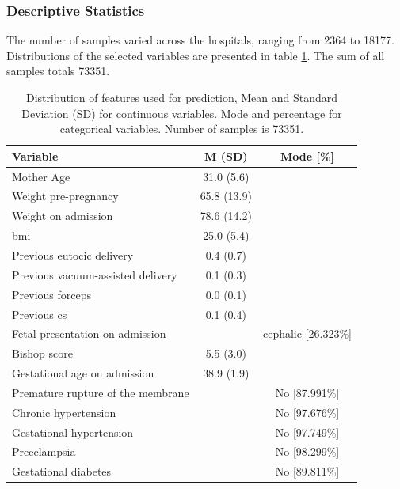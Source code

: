 
\subsubsection{Descriptive Statistics}
The number of samples varied across the hospitals, ranging from 2364 to 18177. Distributions of the selected variables are presented in table \ref{tab:obs_material_1}. The sum of all samples totals 73351.

\begin{table}[htbp]
  \centering
  \caption[Distribution of features used for prediction of delivery Type]{Distribution of features used for prediction, Mean and Standard Deviation (SD) for continuous variables. Mode and percentage for categorical variables. Number of samples is 73351.}
  \label{tab:obs_material_1}
   \renewcommand{\arraystretch}{1.02} %
  \setlength{\tabcolsep}{12pt} %
    \begin{tabular}{m{15em}cc}
    \toprule
        Variable & M (SD) & Mode [\%] \\ 
        \hline
        Mother Age & 31.0 (5.6) & ~ \\ 
        Weight pre-pregnancy & 65.8 (13.9) & ~ \\ 
        Weight on admission & 78.6 (14.2) & ~ \\ 
        \ac{bmi} & 25.0 (5.4) & ~ \\ 
        Previous eutocic delivery & 0.4 (0.7) & ~ \\ 
        Previous vacuum-assisted delivery & 0.1 (0.3) & ~ \\ 
        Previous forceps & 0.0 (0.1) & ~ \\ 
        Previous \ac{cs} & 0.1 (0.4) & ~ \\ 
        Fetal presentation on admission & ~ & cephalic [26.323\%] \\ 
        Bishop score & 5.5 (3.0) & ~ \\ 
        Gestational age on admission & 38.9 (1.9) & ~ \\ 
        Premature rupture of the membrane & ~ & No [87.991\%] \\ 
        Chronic hypertension & ~ & No [97.676\%] \\ 
        Gestational hypertension & ~ & No [97.749\%] \\ 
        Preeclampsia & ~ & No [98.299\%] \\ 
        Gestational diabetes & ~ & No [89.811\%] \\ 

\end{tabular}
\end{table}
